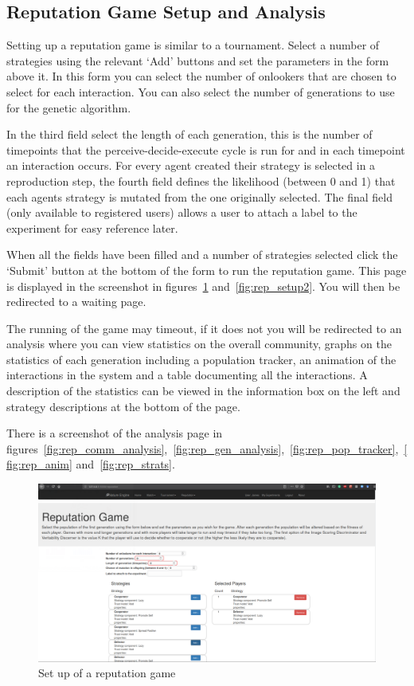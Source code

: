 \documentclass[]{final_report}
\begin{document}
\subsection{Reputation Game Setup and Analysis}
Setting up a reputation game is similar to a tournament. Select a number of strategies using the relevant `Add' buttons and set the parameters in the form above it. In this form you can select the number of onlookers that are chosen to select for each interaction. You can also select the number of generations to use for the genetic algorithm.\par 
In the third field select the length of each generation, this is the number of timepoints that the perceive-decide-execute cycle is run for and in each timepoint an interaction occurs. For every agent created their strategy is selected in a reproduction step, the fourth field defines the likelihood (between 0 and 1) that each agents strategy is mutated from the one originally selected. The final field (only available to registered users) allows a user to attach a label to the experiment for easy reference later.\par 
When all the fields have been filled and a number of strategies selected click the `Submit' button at the bottom of the form to run the reputation game. This page is displayed in the screenshot in figures~\ref{fig:rep_setup} and~\ref{fig:rep_setup2}. You will then be redirected to a waiting page.\par 
The running of the game may timeout, if it does not you will be redirected to an analysis where you can view statistics on the overall community, graphs on the statistics of each generation including a population tracker, an animation of the interactions in the system and a table documenting all the interactions. A description of the statistics can be viewed in the information box on the left and strategy descriptions at the bottom of the page.\par 
There is a screenshot of the analysis page in figures~\ref{fig:rep_comm_analysis},~\ref{fig:rep_gen_analysis},~\ref{fig:rep_pop_tracker},~\ref{fig:rep_anim} and~\ref{fig:rep_strats}.
\begin{figure}
	\includegraphics[width=\textwidth]{RepSetup.png}
	\caption{Set up of a reputation game}
	\label{fig:rep_setup}
\end{figure}
\end{document}
